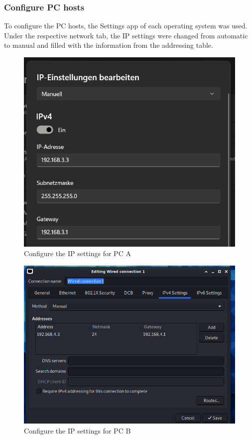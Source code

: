 \documentclass[a4paper]{article}
\begin{document}
\subsubsection{Configure PC hosts}
To configure the PC hosts, the Settings app of each operating system was used. Under the respective network tab, the IP settings were changed from automatic to manual and filled with the information from the addressing table.
\begin{figure}[h]
	\includegraphics[scale=0.4]{images/ipconfmar.png}
	\centering
	\caption{Configure the IP settings for PC A}
\end{figure}
\begin{figure}[h]
	\includegraphics[scale=0.27]{images/ipconfich.png}
	\centering
	\caption{Configure the IP settings for PC B}
\end{figure}
\end{document}
